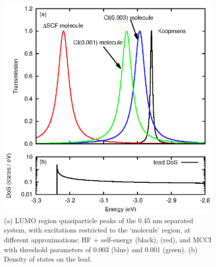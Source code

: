 \begin{figure}
	\begin{center}
		\includegraphics[width=0.9\linewidth]{figures/figure5a_5b}
	\end{center}
	\caption{(a) LUMO region quasiparticle peaks of the 0.45 nm separated
	         system, with excitations restricted to the `molecule' region,
		 at different approximations: HF + self-energy (black),
		 \dscf (red), and MCCI with threshold parameters of
		 0.003 (blue) and 0.001 (green). (b) Density of states on the
		 lead.}
	\label{fig:all45Alumo}
\end{figure}

